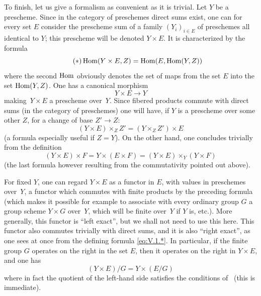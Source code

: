 To finish, let us give a formalism as convenient as it is trivial. Let $Y$
be a prescheme. Since in the category of
preschemes direct sums exist, one can for every
set $E$ consider the prescheme sum of a family
$(Y_i)_{i\in E}$ of preschemes all identical to $Y$; this
prescheme will be denoted $Y\times E$.
It is characterized by the formula
\begin{equation*}
\label{eq:V.1.*}
\tag{$*$} \operatorname{Hom}(Y\times E,Z) = \operatorname{Hom}(E,\operatorname{Hom}(Y,Z))
\end{equation*}
where the second $\operatorname{Hom}$ obviously denotes the set
of maps from the set $E$ into the set $\operatorname{Hom}(Y,Z)$. One has
a canonical morphism
$$
Y\times E\to Y
$$
making~$Y\times E$ a prescheme over~$Y$. Since
fibered products commute with direct sums (in the
category of preschemes) one will have, if $Y$ is a
prescheme over some other $Z$, for a change of base $Z'\to
Z$:
$$
(Y\times E)\times_Z Z'=(Y\times_Z Z')\times E
$$
(a formula especially useful if $Z=Y$). On the other hand, one concludes
trivially from the definition
$$
(Y\times E)\times F=Y\times(E\times F)=(Y\times E)\times_Y(Y\times F)
$$
(the last formula however resulting from the
commutativity pointed out above).

For fixed $Y$, one can regard $Y\times E$ as a functor in
$E$, with values in preschemes over~$Y$, a functor which
commutes with finite products by the preceding formula
(which makes it possible for example to associate with every ordinary group $G$ a
group scheme $Y\times G$ over~$Y$, which will be
finite over~$Y$ if $Y$ is, etc.). More generally, this
functor is ``left exact'', but we shall not need
to use this here. This functor also commutes trivially with direct
sums, and it is also ``right exact'', as one sees
at once from the defining formula \eqref{eq:V.1.*}. In
particular, if the finite group $G$ operates on the right in
the set $E$, then it operates on the right in $Y\times E$, and
one has
$$
(Y\times E)/G = Y\times (E/G)
$$
where in fact the quotient of the left-hand side satisfies the conditions
of~ (this is immediate).
